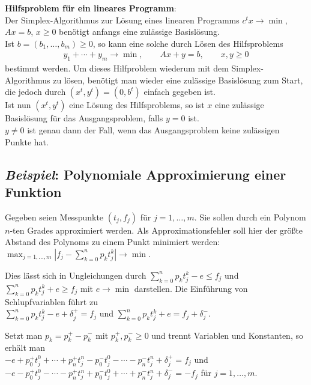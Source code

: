 \linie

\textbf{Hilfsproblem für ein lineares Programm}: \\
Der Simplex-Algorithmus zur Lösung eines linearen Programms
$c^t x \rightarrow \min$, $Ax = b$, $x \ge 0$
benötigt anfangs eine zulässige Basislösung. \\
Ist $b = (b_1, \dotsc, b_m) \ge 0$, so kann eine solche
durch Lösen des Hilfsproblems
\begin{align*}
    y_1 + \dotsb + y_m \rightarrow \min, \qquad
    Ax + y = b, \qquad
    x, y \ge 0
\end{align*}
bestimmt werden.
Um dieses Hilfproblem wiederum mit dem Simplex-Algorithmus zu lösen,
benötigt man wieder eine zulässige Basislösung zum Start, die jedoch
durch $(x^t, y^t) = (0, b^t)$ einfach gegeben ist. \\
Ist nun $(x^t, y^t)$ eine Lösung des Hilfsproblems, so ist $x$ eine
zulässige Basislösung für das Ausgangsproblem, falls $y = 0$ ist. \\
$y \not= 0$ ist genau dann der Fall, wenn das Ausgangsproblem keine
zulässigen Punkte hat.

\pagebreak

\subsection{%
    \emph{Beispiel}: Polynomiale Approximierung einer Funktion%
}

Gegeben seien Messpunkte $(t_j, f_j)$ für $j = 1, \dotsc, m$.
Sie sollen durch ein Polynom $n$-ten Grades approximiert werden.
Als Approximationsfehler soll hier der größte Abstand des Polynoms
zu einem Punkt minimiert werden:
$\max_{j=1,\dotsc,m}
\left|f_j - \sum_{k=0}^n p_k t_j^k\right| \rightarrow \min$.

Dies lässt sich in Ungleichungen durch
$\sum_{k=0}^n p_k t_j^k - e \le f_j$ und
$\sum_{k=0}^n p_k t_j^k + e \ge f_j$ mit $e \rightarrow \min$ darstellen.
Die Einführung von Schlupfvariablen führt zu \\
$\sum_{k=0}^n p_k t_j^k - e + \delta_j^+ = f_j$ und
$\sum_{k=0}^n p_k t_j^k + e = f_j + \delta_j^-$.

Setzt man $p_k = p_k^+ - p_k^-$ mit $p_k^+, p_k^- \ge 0$ und trennt
Variablen und Konstanten, so erhält man \\
$-e + p_0^+ t_j^0 + \dotsb + p_n^+ t_j^n -
p_0^- t_j^0 - \dotsb - p_n^- t_j^n + \delta_j^+ = f_j$ und \\
$-e - p_0^+ t_j^0 - \dotsb - p_n^+ t_j^n +
p_0^- t_j^0 + \dotsb + p_n^- t_j^n + \delta_j^- = -f_j$
für $j = 1, \dotsc, m$.

